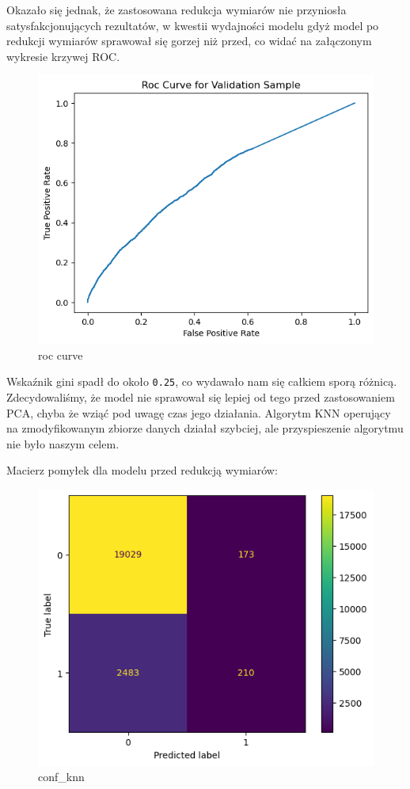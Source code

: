 \documentclass[11pt]{article}
\begin{document}
Okazało się jednak, że zastosowana redukcja wymiarów nie przyniosła
satysfakcjonujących rezultatów, w kwestii wydajności modelu gdyż model
po redukcji wymiarów sprawował się gorzej niż przed, co widać na
załączonym wykresie krzywej ROC.

\begin{figure}
\centering
\includegraphics{plots/KNN_pca_roc.png}
\caption{roc curve}
\end{figure}

Wskaźnik gini spadł do około \texttt{0.25}, co wydawało nam się całkiem
sporą różnicą. Zdecydowaliśmy, że model nie sprawował się lepiej od tego
przed zastosowaniem PCA, chyba że wziąć pod uwagę czas jego działania.
Algorytm KNN operujący na zmodyfikowanym zbiorze danych działał
szybciej, ale przyspieszenie algorytmu nie było naszym celem.

Macierz pomyłek dla modelu przed redukcją wymiarów:

\begin{figure}
\centering
\includegraphics{plots/KNN_confusion.png}
\caption{conf\_knn}
\end{figure}
\end{document}
